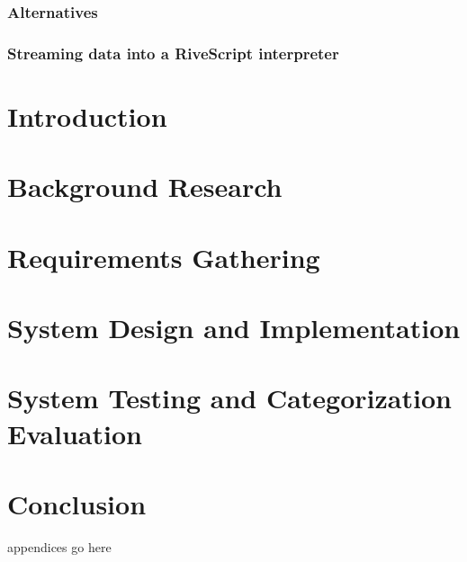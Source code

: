 \documentclass[12pt, twoside, a4paper, draft]{report}
\begin{document}
\subsection{Alternatives}
\subsection{Streaming data into a RiveScript interpreter}

\chapter{Introduction}

\chapter{Background Research}

\chapter{Requirements Gathering}

\chapter{System Design and Implementation}

\chapter{System Testing and Categorization Evaluation}

\chapter{Conclusion}

\appendix
appendices go here
\end{document}
